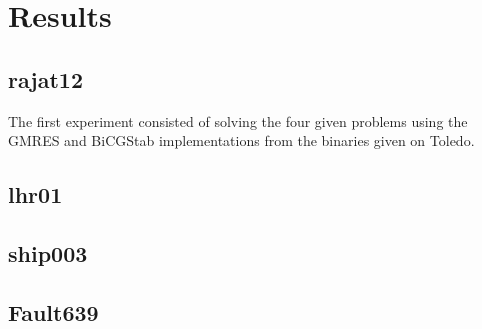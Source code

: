 \section{Results}

\subsection{rajat12}
The first experiment consisted of solving the four given problems using the GMRES and BiCGStab implementations 
from the binaries given on Toledo. 
 
\subsection{lhr01}

\subsection{ship003}

\subsection{Fault639}